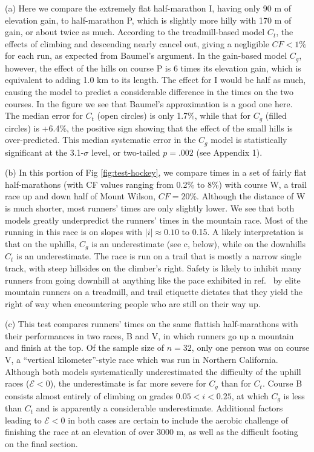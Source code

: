 \documentclass[10pt,letterpaper]{article}
\begin{document}
(a) Here we compare the extremely flat half-marathon I, having only 90 m of elevation gain,
to half-marathon P, which is slightly more hilly with 170 m of gain, or about twice as much.
According to the treadmill-based model $C_t$, the effects of climbing and descending
nearly cancel out, giving a negligible $CF<1\%$ for each run, as expected from Baumel's argument.
In the gain-based model $C_g$, however, the effect of the hills on course P is
6 times its elevation gain, which is equivalent to adding 1.0 km to its length. The effect for I would
be half as much, causing the model to predict a considerable difference in the times on
the two courses. In the figure we see that Baumel's approximation is a good one here. The median
error for $C_t$ (open circles) is only 1.7\%, while that for $C_g$ (filled circles) is +6.4\%,
the positive sign showing that the effect of the small hills is over-predicted.
This median systematic error in the $C_g$ model is statistically significant
at the 3.1-$\sigma$ level, or two-tailed $p=.002$ (see Appendix 1).


(b) In this portion of Fig \ref{fig:test-hockey}, we compare times in a set of fairly flat half-marathons
(with CF values ranging from 0.2\% to 8\%) with course W, a trail race up and down half of Mount Wilson, $CF=20\%$.
Although the distance of W is much shorter, most runners' times are only slightly lower. We see that both
models greatly underpredict the runners' times in the mountain race. Most of the running in this race is
on slopes with $|i|\approx 0.10$ to 0.15. A likely interpretation is that on the uphills, $C_g$ is an
underestimate (see c, below), while on the downhills $C_t$ is an underestimate. The race is run on a trail that is
mostly a narrow single track, with steep hillsides on the climber's right. Safety is likely to inhibit
many runners from going downhill at anything like the pace exhibited in ref.~\cite{minetti} by elite mountain runners
on a treadmill, and trail etiquette dictates that they yield the right of way when encountering
people who are still on their way up.

(c) This test compares runners' times on the same flattish half-marathons with their performances in
two races, B and V, in which runners go up a mountain and finish at the top. Of the sample size of $n=32$, only
one person was on course V, a ``vertical kilometer''-style race which was run in Northern California.
Although both models systematically underestimated the difficulty of the uphill races ($\mathcal{E}<0$),
the underestimate is far more severe for $C_g$ than for $C_t$. Course B consists almost
entirely of climbing on grades $0.05<i<0.25$, at which $C_g$ is less than $C_t$ and is apparently a
considerable underestimate. Additional factors leading to $\mathcal{E}<0$ in both cases
are certain to include the aerobic challenge of finishing the race at an elevation of over 3000 m,
as well as the difficult footing on the final section.
\end{document}
